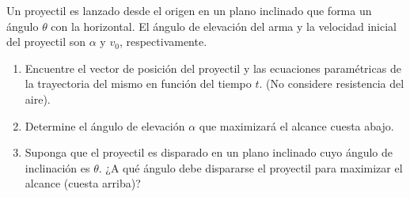 \item Un proyectil es lanzado desde el origen en un plano inclinado que forma un ángulo $\theta$ con la horizontal. El ángulo de elevación del arma y la velocidad inicial del proyectil son $\alpha$ y $v_0$, respectivamente.
    \begin{enumerate}
        \item Encuentre el vector de posición del proyectil y las ecuaciones paramétricas de la trayectoria del mismo en función del tiempo $t$. (No considere resistencia del aire).
        \item Determine el ángulo de elevación $\alpha$ que maximizará el alcance cuesta abajo.
        \item Suponga que el proyectil es disparado en un plano inclinado cuyo ángulo de inclinación es $\theta$. ¿A qué ángulo debe dispararse el proyectil para maximizar el alcance (cuesta arriba)?
    \end{enumerate}
